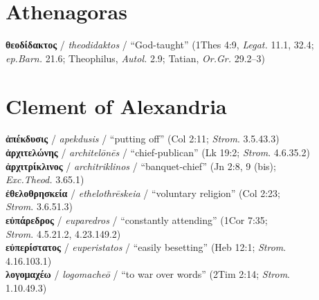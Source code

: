 \section{Athenagoras}

\noindent{}\textbf{θεοδίδακτος} / \textit{theodidaktos} / “God-taught” (1Thes 4:9, \textit{Legat.} 11.1, 32.4; %
\\ %
 \makebox[3em][l]{} \textit{ep.Barn.} 21.6; Theophilus, \textit{Autol.} 2.9; Tatian, \textit{Or.Gr.} 29.2--3) \\[1mm] %

\section{Clement of Alexandria}

\noindent{}\textbf{ἀπέκδυσις} / \textit{apekdusis} / “putting off” (Col 2:11; \textit{Strom}. 3.5.43.3) \\[0.4mm] %
\noindent{}\textbf{ἀρχιτελώνης} / \textit{architelōnēs} / “chief-publican” (Lk 19:2; \textit{Strom}. 4.6.35.2) \\[0.4mm] %
\noindent{}\textbf{ἀρχιτρίκλινος} / \textit{architriklinos} / “banquet-chief” (Jn 2:8, 9 (bis); \\\makebox[3em][l]{}\textit{Exc.Theod.} 3.65.1) \\[0.4mm] %
\noindent{}\textbf{ἐθελοθρησκεία} / \textit{ethelothrēskeia} / “voluntary religion” (Col 2:23; \\\makebox[3em][l]{}\textit{Strom}. 3.6.51.3) \\[0.4mm] %
\noindent{}\textbf{εὐπάρεδρος} / \textit{euparedros} / “constantly attending” (1Cor 7:35; \\\makebox[3em][l]{}\textit{Strom}. 4.5.21.2, 4.23.149.2) \\[0.4mm] %
\noindent{}\textbf{εὐπερίστατος} / \textit{euperistatos} / “easily besetting” (Heb 12:1; \textit{Strom}. \\\makebox[3em][l]{}4.16.103.1) \\[0.4mm] %
\noindent{}\textbf{λογομαχέω} / \textit{logomacheō} / “to war over words” (2Tim 2:14; \textit{Strom}. \\\makebox[3em][l]{}1.10.49.3) \\[0.4mm] %
